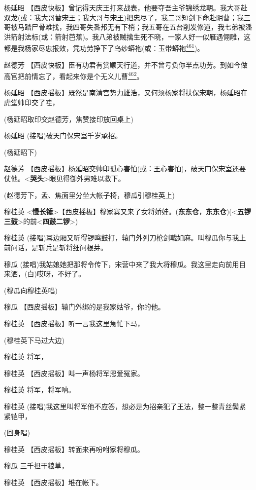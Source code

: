 杨延昭
【西皮快板】曾记得天庆王打来战表，他要夺吾主爷锦绣龙朝。我大哥赴双龙(或：我大哥替宋王；我大哥与宋王)把忠尽了，我二哥短剑下命赴阴曹；我三哥被马踏尸骨难找，我四哥失番邦无有下梢；我五哥在五台削发修道，我七弟被潘洪箭射法标(或：箭射芭蕉)。我八弟被贼擒生死不晓，一家人好一似雁遇翎雕，这都是我杨家尽忠报效，凭功劳挣下了乌纱蟒袍(或：玉带蟒袍\protect\hyperlink{fn461}{\textsuperscript{461}})。

赵德芳
【西皮快板】臣有功君有赏顺天行道，并不曾亏负你半点功劳。到如今做高官把前情忘了，看起来你是个无义儿曹\protect\hyperlink{fn462}{\textsuperscript{462}}。

杨延昭
【西皮摇板】既然是南清宫势力雄浩，又何须杨家将扶保宋朝，杨延昭在虎堂帅印交了哇，

(杨延昭取印交赵德芳，焦赞接印放回桌上)

杨延昭 (接唱)破天门保宋室千岁承招。

(杨延昭下)

赵德芳
【西皮摇板】杨延昭交帅印孤心害怕(或：王心害怕)，破天门保宋室还要仗他。\textless{}\textbf{哭头}\textgreater{}眼见得御外男难以救下。

(赵德芳下，孟、焦面里分坐大帐子椅，穆瓜引穆桂英上)

穆桂英
\textless{}\textbf{慢长锤}\textgreater{}【西皮摇板】穆家寨又来了女将娇娃。(\textbf{东东仓}，\textbf{东东仓})(\textless{}\textbf{五锣三鼓}\textgreater{}的前\textless{}\textbf{四鼓二锣}\textgreater{})

穆桂英
(接唱)耳边厢又听得锣鸣鼓打，辕门外列刀枪剑戟如麻。叫穆瓜你与我上前问话，是斩兵是斩将细问根芽。

穆瓜
(接唱)我姑娘她把那将令传下，宋营中来了我大将穆瓜。我这里走向前用目来洒，(白)哎呀，不好了。

(穆瓜向穆桂英唱)

穆瓜 【西皮摇板】辕门外绑的是我家姑爷，你的他。

穆桂英 【西皮摇板】听一言我这里急忙下马，

(穆桂英下马过大边)

穆桂英 将军，

穆桂英 【西皮摇板】叫一声杨将军恩爱冤家。

穆桂英 将军，将军呐。

穆桂英
(接唱)我这里叫将军他不应答，想必是为招亲犯了王法，整一整青丝鬓紧紧铠甲，

(回身唱)

穆桂英 【西皮摇板】转面来再吩咐家将穆瓜。

穆瓜 三千担干粮草，

穆桂英 【西皮摇板】堆在帐下。

